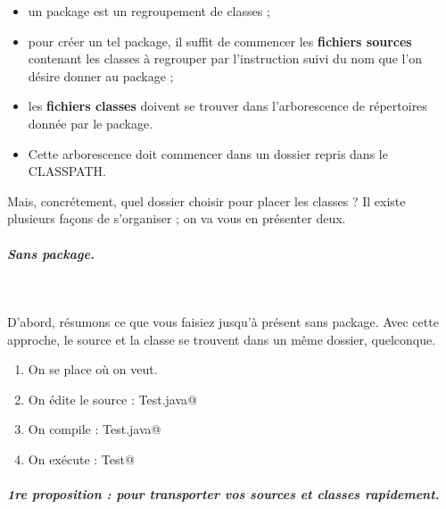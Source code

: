 \documentclass[11pt,a4paper]{article}
\begin{document}
					\begin{itemize}
				
			\item 
					un package est un regroupement de classes ;
				
			\item 
					pour cr\'eer un tel package,
					il suffit de commencer les 
					\textbf{fichiers sources} 
					contenant les classes \`a regrouper
					par l'instruction 
					\verb@package@ 
					suivi du nom 
					que l'on d\'esire donner au package ;
				
			\item 
					les \textbf{fichiers classes} 
					doivent se trouver dans l'arborescence de r\'epertoires 
					donn\'ee par le package.
				
			\item 
					Cette arborescence doit commencer dans un dossier
					repris dans le CLASSPATH.
				
					\end{itemize}
				
				Mais, concr\'etement,
				quel dossier choisir pour placer les classes ?
				Il existe plusieurs fa\c cons de s'organiser ;
				on va vous en pr\'esenter deux. 
			
            \par
        
			
		\subparagraph{Sans package.} 
		
					\textcolor{white}{.} \par
				
				D'abord, r\'esumons ce que vous faisiez jusqu'\`a pr\'esent
				sans package.
				Avec cette approche, le source et la classe
				se trouvent dans un m\^eme dossier, quelconque.
			
            \par
        
					\begin{enumerate}
				
			\item 
					On se place o\`u on veut.
				
			\item 
					On \'edite le source : \verb@nano Test.java@
			\item 
					On compile : \verb@javac Test.java@
			\item 
					On ex\'ecute : \verb@java Test@
					\end{enumerate}
				
			
		\subparagraph{1re proposition : pour transporter vos sources et classes rapidement.} 
		
\end{document}
